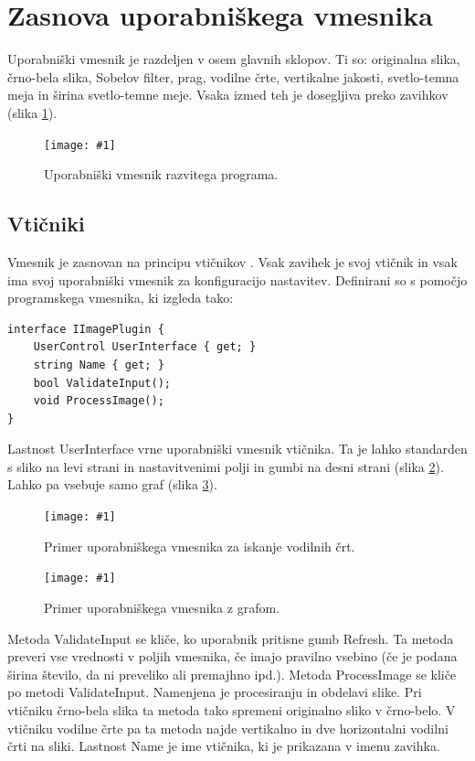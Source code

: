 \documentclass[oneside, a4paper, 12pt]{book}
\newcommand{\slika}[3]{
	\begin{figure}
	\begin{center}
	\texttt{[image: \#1]}
	\end{center}
	\vspace{-20pt}
	\caption{#2}
	\label{#3}
	\end{figure}
}
\begin{document}
\section{Zasnova uporabniškega vmesnika}
Uporabniški vmesnik je razdeljen v osem glavnih sklopov. Ti so: originalna 
slika, črno-bela slika, Sobelov filter, prag, vodilne črte, vertikalne 
jakosti, svetlo-temna meja in širina svetlo-temne meje. Vsaka izmed teh 
je dosegljiva preko zavihkov (slika \ref{pic:vmesnik1}).

\slika{slike/vmesnik-glavni.jpg}{Uporabniški vmesnik razvitega programa.}
{pic:vmesnik1}

\subsection{Vtičniki}
Vmesnik je zasnovan na principu vtičnikov \cite{oreilly-dp, oreilly-cs}. 
Vsak zavihek je svoj vtičnik in vsak ima svoj uporabniški vmesnik za 
konfiguracijo nastavitev. Definirani so s pomočjo programskega vmesnika, 
ki izgleda tako:
\begin{samepage}
\begin{verbatim}
interface IImagePlugin {
    UserControl UserInterface { get; }
    string Name { get; }
    bool ValidateInput();
    void ProcessImage();
}
\end{verbatim}
\end{samepage}
Lastnost UserInterface vrne uporabniški vmesnik vtičnika. Ta je lahko 
standarden s sliko na levi strani in nastavitvenimi polji in gumbi na 
desni strani (slika \ref{pic:vmesnik2}). Lahko pa vsebuje samo graf 
(slika \ref{pic:vmesnik3}).

\slika{slike/vmesnik-slika-konfiguracija.jpg}{Primer uporabniškega 
vmesnika za iskanje vodilnih črt.}{pic:vmesnik2}

\slika{slike/vmesnik-samo-graf.jpg}{Primer uporabniškega vmesnika z 
grafom.}{pic:vmesnik3}

Metoda ValidateInput se kliče, ko uporabnik pritisne gumb Refresh. 
Ta metoda preveri vse vrednosti v poljih vmesnika, če imajo pravilno 
vsebino (če je podana širina število, da ni preveliko ali premajhno ipd.).
Metoda ProcessImage se kliče po metodi ValidateInput. Namenjena je 
procesiranju in obdelavi slike. Pri vtičniku črno-bela slika ta metoda 
tako spremeni originalno sliko v črno-belo. V vtičniku vodilne črte pa 
ta metoda najde vertikalno in dve horizontalni vodilni črti na sliki. 
Lastnost Name je ime vtičnika, ki je prikazana v imenu zavihka.
\end{document}
